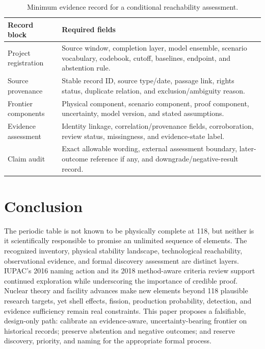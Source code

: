 \documentclass[conference]{IEEEtran}
\begin{document}
\begin{table}[!t]
\caption{Minimum evidence record for a conditional reachability assessment.}
\label{tab:record-contract}
\centering
\renewcommand{\arraystretch}{1.15}
\begin{tabular}{|P{0.27\columnwidth}|P{0.54\columnwidth}|}
\hline
\textbf{Record block} & \textbf{Required fields} \\
\hline
Project registration & Source window, completion layer, model ensemble, scenario vocabulary, codebook, cutoff, baselines, endpoint, and abstention rule. \\
\hline
Source provenance & Stable record ID, source type/date, passage link, rights status, duplicate relation, and exclusion/ambiguity reason. \\
\hline
Frontier components & Physical component, scenario component, proof component, uncertainty, model version, and stated assumptions. \\
\hline
Evidence assessment & Identity linkage, correlation/provenance fields, corroboration, review status, missingness, and evidence-state label. \\
\hline
Claim audit & Exact allowable wording, external assessment boundary, later-outcome reference if any, and downgrade/negative-result record. \\
\hline
\end{tabular}
\end{table}

\balance
\section{Conclusion}

The periodic table is not known to be physically complete at 118, but neither is it scientifically responsible to promise an unlimited sequence of elements. The recognized inventory, physical stability landscape, technological reachability, observational evidence, and formal discovery assessment are distinct layers. IUPAC's 2016 naming action and its 2018 method-aware criteria review support continued exploration while underscoring the importance of credible proof. Nuclear theory and facility advances make new elements beyond 118 plausible research targets, yet shell effects, fission, production probability, detection, and evidence sufficiency remain real constraints. This paper proposes a falsifiable, design-only path: calibrate an evidence-aware, uncertainty-bearing frontier on historical records; preserve abstention and negative outcomes; and reserve discovery, priority, and naming for the appropriate formal process.
\end{document}
